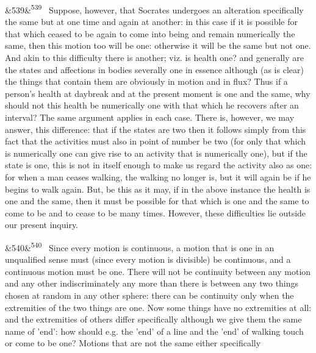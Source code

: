 \documentclass[12pt]{article}
\newcommand{\para}[1][]{\par\noindent\ifx&#1&\else\textsuperscript{\footnotesize #1}~\fi}
\begin{document}
\para[539] Suppose, however, that Socrates undergoes an alteration specifically the same but at one time and again at another: in this case if it is possible for that which ceased to be again to come into being and remain numerically the same, then this motion too will be one: otherwise it will be the same but not one. And akin to this difficulty there is another; viz. is health one? and generally are the states and affections in bodies severally one in essence although (as is clear) the things that contain them are obviously in motion and in flux? Thus if a person's health at daybreak and at the present moment is one and the same, why should not this health be numerically one with that which he recovers after an interval? The same argument applies in each case. There is, however, we may answer, this difference: that if the states are two then it follows simply from this fact that the activities must also in point of number be two (for only that which is numerically one can give rise to an activity that is numerically one), but if the state is one, this is not in itself enough to make us regard the activity also as one: for when a man ceases walking, the walking no longer is, but it will again be if he begins to walk again. But, be this as it may, if in the above instance the health is one and the same, then it must be possible for that which is one and the same to come to be and to cease to be many times. However, these difficulties lie outside our present inquiry.

\para[540] Since every motion is continuous, a motion that is one in an unqualified sense must (since every motion is divisible) be continuous, and a continuous motion must be one. There will not be continuity between any motion and any other indiscriminately any more than there is between any two things chosen at random in any other sphere: there can be continuity only when the extremities of the two things are one. Now some things have no extremities at all: and the extremities of others differ specifically although we give them the same name of 'end': how should e.g. the 'end' of a line and the 'end' of walking touch or come to be one? Motions that are not the same either specifically
\end{document}
